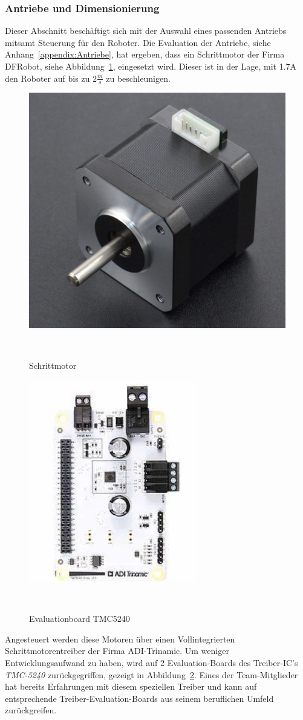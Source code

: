 \documentclass[main.tex]{subfiles} %
\begin{document}

\subsubsection{Antriebe und Dimensionierung}

Dieser Abschnitt beschäftigt sich mit der Auswahl eines passenden Antriebs
mitsamt Steuerung für den Roboter. Die Evaluation der Antriebe, siehe
Anhang~\ref{appendix:Antriebe}, hat ergeben, dass ein Schrittmotor der Firma
DFRobot, siehe Abbildung~\ref{Schrittmotor_FIT0278}, eingesetzt wird. Dieser
ist in der Lage, mit 1.7A den Roboter auf bis zu $2\frac{m}{s}$ zu
beschleunigen.

\begin{figure}[H]
    \centering
    \includegraphics[width = 0.25 \linewidth]{fig_Antriebe_und_Dimensionierung/DFRobot_Stepper_FIT0278.png}
    \caption{Schrittmotor}~\label{Schrittmotor_FIT0278}
\end{figure}

\begin{figure}[H]
    \centering
    \includegraphics[width = 0.25 \linewidth]{fig_Antriebe_und_Dimensionierung/TMC_5240_EVAL.png}
    \caption{Evaluationboard TMC5240}~\label{Schrittmotorentreiber_EVAL}
\end{figure}

Angesteuert werden diese Motoren über einen Vollintegrierten
Schrittmotorentreiber der Firma ADI-Trinamic. Um weniger Entwicklungsaufwand zu
haben, wird auf 2 Evaluation-Boards des Treiber-IC's \textit{TMC-5240}
zurückgegriffen, gezeigt in Abbildung~\ref{Schrittmotorentreiber_EVAL}. Eines
der Team-Mitglieder hat bereits Erfahrungen mit diesem speziellen Treiber und
kann auf entsprechende Treiber-Evaluation-Boards aus seinem beruflichen Umfeld
zurückgreifen.
\end{document}
